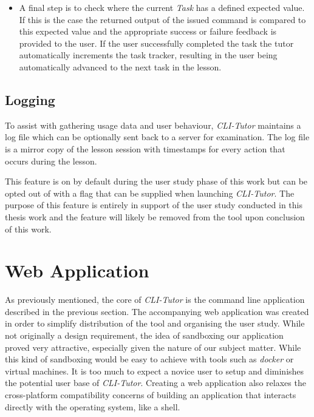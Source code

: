 \begin{itemize}
    \item A final step is to check where the current \textit{Task} has a
        defined expected value. If this is the case the returned output of the
        issued command is compared to this expected value and the appropriate
        success or failure feedback is provided to the user. If the user
        successfully completed the task the tutor automatically increments the
        task tracker, resulting in the user being automatically advanced to the
        next task in the lesson.


\end{itemize}

\subsection{Logging}

To assist with gathering usage data and user behaviour, \textit{CLI-Tutor}
maintains a log file which can be optionally sent back to a server for
examination. The log file is a mirror copy of the lesson session with
timestamps for every action that occurs during the lesson.

This feature is on by default during the user study phase of this work but can
be opted out of with a flag that can be supplied when launching
\textit{CLI-Tutor}. The purpose of this feature is entirely in support of the
user study conducted in this thesis work and the feature will likely be removed
from the tool upon conclusion of this work.

\section{Web Application}

As previously mentioned, the core of \textit{CLI-Tutor} is the command line
application described in the previous section. The accompanying web application
was created in order to simplify distribution of the tool and organising the
user study. While not originally a design requirement, the idea of sandboxing
our application proved very attractive, especially given the nature of our
subject matter. While this kind of sandboxing would be easy to achieve with
tools such as \textit{docker} or virtual machines. It is too much to expect a
novice user to setup and diminishes the potential user base of
\textit{CLI-Tutor}. Creating a web application also relaxes the cross-platform
compatibility concerns of building an application that interacts directly with
the operating system, like a shell.


